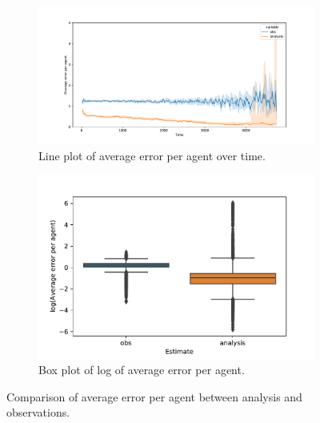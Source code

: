 \documentclass{article}
\begin{document}
\begin{figure}[htbp]
	\centering
	\begin{subfigure}[htb]{0.54\textwidth}
		\centering
		\includegraphics[width=\textwidth]{figures/exp2/truncated_median_analysis_obs_line.pdf}
		\caption{Line plot of average error per agent over
			time.}\label{fig:analysis_obs_line}
	\end{subfigure}
	\begin{subfigure}[htb]{0.45\textwidth}
		\centering
		\includegraphics[width=\textwidth]{figures/exp2/truncated_median_analysis_obs_log_box.pdf}
		\caption{Box plot of log of average error per
			agent.}\label{fig:analysis_obs_log_box}
	\end{subfigure}
	\caption{Comparison of average error per agent between analysis and
		observations.}\label{fig:median_analysis_obs}
\end{figure}
\end{document}
